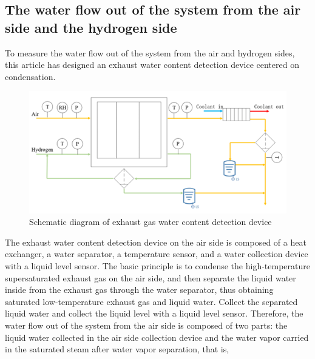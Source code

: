 \subsection*{The water flow out of the system from the air side and the hydrogen side}
To measure the water flow out of the system from the air and hydrogen sides, this article has designed an exhaust water content detection device centered on condensation.
\begin{figure}
	\centering

	\includegraphics[scale=0.6]{Research_pictures/picture3.png}
	\caption[short]{Schematic diagram of exhaust gas water content detection device}
	\label{fig:water_detection_device_diagram}
\end{figure}
The exhaust water content detection device on the air side is composed of a heat exchanger, a water separator, a temperature sensor, and a water collection device with a liquid level sensor. The basic principle is to condense the high-temperature supersaturated exhaust gas on the air side, and then separate the liquid water inside from the exhaust gas through the water separator, thus obtaining saturated low-temperature exhaust gas and liquid water. Collect the separated liquid water and collect the liquid level with a liquid level sensor.
Therefore, the water flow out of the system from the air side is composed of two parts: the liquid water collected in the air side collection device and the water vapor carried in the saturated steam after water vapor separation, that is,
